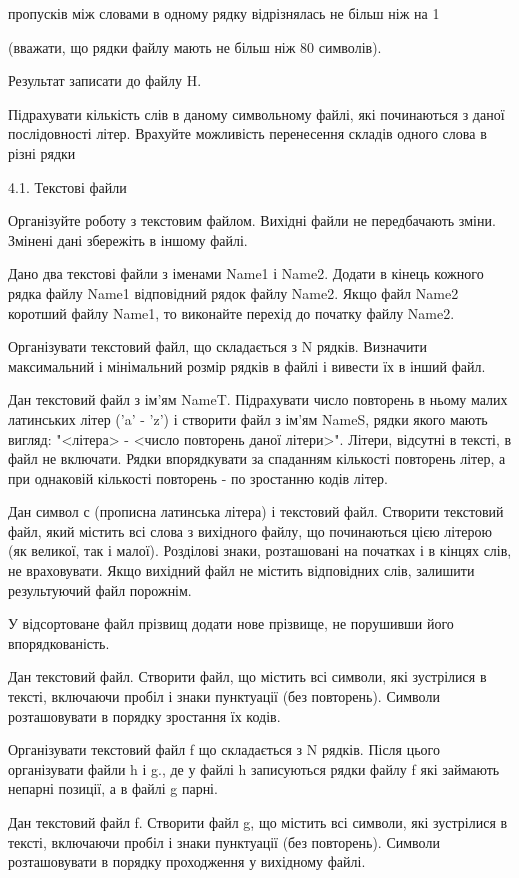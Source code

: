 \documentclass[]{article}
\begin{document}
пропусків між словами в одному рядку відрізнялась не більш ніж на 1

(вважати, що рядки файлу мають не більш ніж 80 символів).

Результат записати до файлу H.

Підрахувати кількість слів в даному символьному файлі, які починаються з
даної послідовності літер. Врахуйте можливість перенесення складів
одного слова в різні рядки

4.1. Текстові файли

\protect\hypertarget{_Hlk65238588}{}{}Організуйте роботу з текстовим
файлом. Вихідні файли не передбачають зміни. Змінені дані збережіть в
іншому файлі.

Дано два текстові файли з іменами Name1 і Name2. Додати в кінець кожного
рядка файлу Name1 відповідний рядок файлу Name2. Якщо файл Name2
коротший файлу Name1, то виконайте перехід до початку файлу Name2.

Організувати текстовий файл, що складається з N рядків. Визначити
максимальний і мінімальний розмір рядків в файлі і вивести їх в інший
файл.

Дан текстовий файл з ім'ям NameT. Підрахувати число повторень в ньому
малих латинських літер ('a' - 'z') і створити файл з ім'ям NameS, рядки
якого мають вигляд: "\textless{}літера\textgreater{} - \textless{}число
повторень даної літери\textgreater{}". Літери, відсутні в тексті, в файл
не включати. Рядки впорядкувати за спаданням кількості повторень літер,
а при однаковій кількості повторень - по зростанню кодів літер.

Дан символ с (прописна латинська літера) і текстовий файл. Створити
текстовий файл, який містить всі слова з вихідного файлу, що починаються
цією літерою (як великої, так і малої). Розділові знаки, розташовані на
початках і в кінцях слів, не враховувати. Якщо вихідний файл не містить
відповідних слів, залишити результуючий файл порожнім.

У відсортоване файл прізвищ додати нове прізвище, не порушивши його
впорядкованість.

Дан текстовий файл. Створити файл, що містить всі символи, які
зустрілися в тексті, включаючи пробіл і знаки пунктуації (без
повторень). Символи розташовувати в порядку зростання їх кодів.

Організувати текстовий файл f що складається з N рядків. Після цього
організувати файли h і g., де у файлі h записуються рядки файлу f які
займають непарні позиції, а в файлі g парні.

Дан текстовий файл f. Створити файл g, що містить всі символи, які
зустрілися в тексті, включаючи пробіл і знаки пунктуації (без
повторень). Символи розташовувати в порядку проходження у вихідному
файлі.
\end{document}
